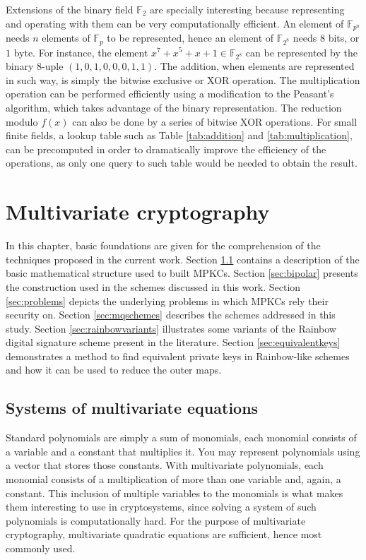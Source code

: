 \documentclass{ufsctex/ufsctex}
\begin{document}
Extensions of the binary field $\mathbb{F}_2$ are specially interesting because
representing and operating with them can be very computationally efficient. An
element of $\mathbb{F}_{p^n}$ needs $n$ elements of $\mathbb{F}_p$ to be
represented, hence an element of $\mathbb{F}_{2^8}$ needs $8$ bits, or $1$
byte. For instance, the element $x^7 + x^5 + x + 1 \in \mathbb{F}_{2^8}$ can be
represented by the binary $8$-uple $(1, 0, 1, 0, 0, 0, 1, 1)$. The addition,
when elements are represented in such way, is simply the bitwise exclusive or
XOR operation. The multiplication operation can be performed efficiently using
a modification to the Peasant's algorithm, which takes advantage of the binary
representation. The reduction modulo $f(x)$ can also be done by a series of
bitwise XOR operations. For small finite fields, a lookup table such as Table
\ref{tab:addition} and \ref{tab:multiplication}, can be precomputed in order to
dramatically improve the efficiency of the operations, as only one query to
such table would be needed to obtain the result.

\chapter{Multivariate cryptography}

In this chapter, basic foundations are given for the comprehension of the
techniques proposed in the current work. Section \ref{sec:mqsystems} contains a
description of the basic mathematical structure used to built MPKCs. Section
\ref{sec:bipolar} presents the construction used in the schemes discussed in
this work. Section \ref{sec:problems} depicts the underlying problems in which
MPKCs rely their security on. Section \ref{sec:mqschemes} describes the schemes
addressed in this study. Section \ref{sec:rainbowvariants} illustrates some
variants of the Rainbow digital signature scheme present in the literature.
Section \ref{sec:equivalentkeys} demonstrates a method to find equivalent
private keys in Rainbow-like schemes and how it can be used to reduce the outer
maps.

\section{Systems of multivariate equations}\label{sec:mqsystems}

Standard polynomials are simply a sum of monomials, each monomial consists of a
variable and a constant that multiplies it. You may represent polynomials using
a vector that stores those constants. With multivariate polynomials, each
monomial consists of a multiplication of more than one variable and, again, a
constant. This inclusion of multiple variables to the monomials is what makes
them interesting to use in cryptosystems, since solving a system of such
polynomials is computationally hard. For the purpose of multivariate
cryptography, multivariate quadratic equations are sufficient, hence most
commonly used.
\end{document}
